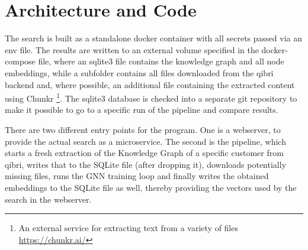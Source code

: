 \documentclass[draft,final]{vutinfth} %
\begin{document}
\section{Architecture and Code}
The search is built as a standalone docker container with all secrets passed via an env file. The results are written to an external volume specified in the docker-compose file, where an sqlite3 file contains the knowledge graph and all node embeddings, while a subfolder contains all files downloaded from the qibri backend and, where possible, an additional file containing the extracted content using Chunkr \footnote{An external service for extracting text from a variety of files \url{https://chunkr.ai/}}. The sqlite3 database is checked into a separate git repository to make it possible to go to a specific run of the pipeline and compare results.

There are two different entry points for the program. One is a webserver, to provide the actual search as a microservice. The second is the pipeline, which starts a fresh extraction of the Knowledge Graph of a specific customer from qibri, writes that to the SQLite file (after dropping it), downloads potentially missing files, runs the GNN training loop and finally writes the obtained embeddings to the SQLite file as well, thereby providing the vectors used by the search in the webserver.
\end{document}
